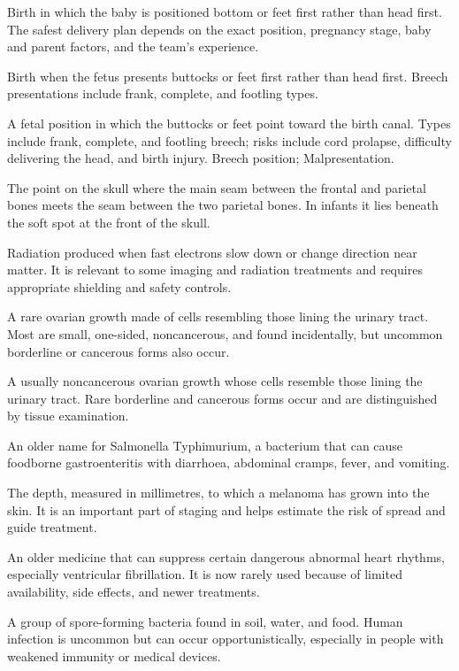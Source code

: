  Birth in which the baby is positioned bottom or feet first rather than head first. The safest delivery plan depends on the exact position, pregnancy stage, baby and parent factors, and the team's experience.

 Birth when the fetus presents buttocks or feet first rather than head first. Breech presentations include frank, complete, and footling types.

 A fetal position in which the buttocks or feet point toward the birth canal. Types include frank, complete, and footling breech; risks include cord prolapse, difficulty delivering the head, and birth injury.
\synonyms Breech position; Malpresentation.

 The point on the skull where the main seam between the frontal and parietal bones meets the seam between the two parietal bones. In infants it lies beneath the soft spot at the front of the skull.

 Radiation produced when fast electrons slow down or change direction near matter. It is relevant to some imaging and radiation treatments and requires appropriate shielding and safety controls.

 A rare ovarian growth made of cells resembling those lining the urinary tract. Most are small, one-sided, noncancerous, and found incidentally, but uncommon borderline or cancerous forms also occur.

 A usually noncancerous ovarian growth whose cells resemble those lining the urinary tract. Rare borderline and cancerous forms occur and are distinguished by tissue examination.

 An older name for Salmonella Typhimurium, a bacterium that can cause foodborne gastroenteritis with diarrhoea, abdominal cramps, fever, and vomiting.

 The depth, measured in millimetres, to which a melanoma has grown into the skin. It is an important part of staging and helps estimate the risk of spread and guide treatment.

 An older medicine that can suppress certain dangerous abnormal heart rhythms, especially ventricular fibrillation. It is now rarely used because of limited availability, side effects, and newer treatments.

 A group of spore-forming bacteria found in soil, water, and food. Human infection is uncommon but can occur opportunistically, especially in people with weakened immunity or medical devices.

